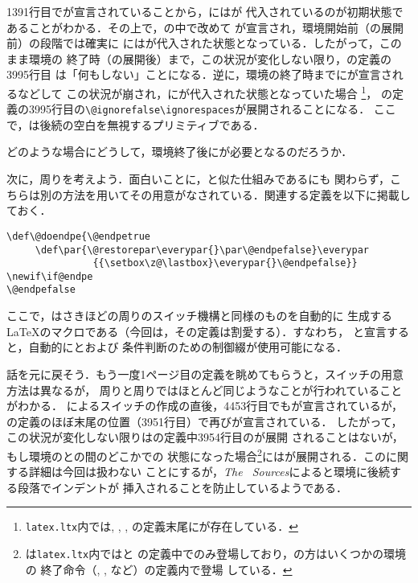 \documentclass[autodetect-engine,dvipdfmx]{jsarticle}
\begin{document}
1391行目でが宣言されていることから，にはが
代入されているのが初期状態であることがわかる．その上で，の中で改めて
が宣言され，環境開始前（の展開前）の段階では確実に
にはが代入された状態となっている．したがって，このまま環境の
終了時（の展開後）まで，この状況が変化しない限り，の定義の3995行目
は「何もしない」ことになる．逆に，環境の終了時までにが宣言されるなどして
この状況が崩され，にが代入された状態となっていた場合
\footnote{\texttt{latex.ltx}内では, , 
, の定義末尾にが存在している．}，
の定義の3995行目の\preSub\verb|\@ignorefalse\ignorespaces|が展開されることになる．
ここで，は後続の空白を無視するプリミティブである．

\begin{question}
どのような場合にどうして，環境終了後にが必要となるのだろうか．
\end{question}

\newpage

次に，周りを考えよう．面白いことに，と似た仕組みであるにも
関わらず，こちらは別の方法を用いてその用意がなされている．関連する定義を以下に掲載しておく．

\begin{lstlisting}[firstnumber=4449]
\def\@doendpe{\@endpetrue
     \def\par{\@restorepar\everypar{}\par\@endpefalse}\everypar
               {{\setbox\z@\lastbox}\everypar{}\@endpefalse}}
\newif\if@endpe
\@endpefalse
\end{lstlisting}

ここで，はさきほどの周りのスイッチ機構と同様のものを自動的に
生成する\LaTeX のマクロである（今回は，その定義は割愛する）．すなわち，
と宣言すると，自動的にとおよび
条件判断のための制御綴が使用可能になる．

話を元に戻そう．もう一度1ページ目の定義を眺めてもらうと，スイッチの用意方法は異なるが，
周りと周りではほとんど同じようなことが行われていることがわかる．
によるスイッチの作成の直後，4453行目でもが宣言されているが，
の定義のほぼ末尾の位置（3951行目）で再びが宣言されている．
したがって，この状況が変化しない限りはの定義中3954行目のが展開
されることはないが，もし環境のとの間のどこかでの
状態になった場合\footnote{は\texttt{latex.ltx}内ではと
の定義中でのみ登場しており，の方はいくつかの環境の
終了命令（, , など）の定義内で登場
している．}にはが展開される．このに関する詳細は今回は扱わない
ことにするが，\textsl{The \LaTeXe\ Sources}によると環境に後続する段落でインデントが
挿入されることを防止しているようである．
\end{document}
